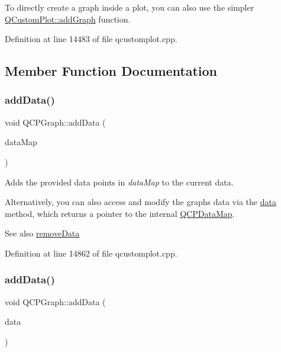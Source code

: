 To directly create a graph inside a plot, you can also use the simpler \hyperlink{class_q_custom_plot_a6fb2873d35a8a8089842d81a70a54167}{Q\+Custom\+Plot\+::add\+Graph} function. 

Definition at line 14483 of file qcustomplot.\+cpp.



\subsection{Member Function Documentation}
\mbox{\label{class_q_c_p_graph_aa5c6181d84db72ce4dbe9dc15a34ef4f}} 
\subsubsection{\texorpdfstring{add\+Data()}{addData()}\hspace{0.1cm}{\footnotesize\ttfamily [1/4]}}
{\footnotesize\ttfamily void Q\+C\+P\+Graph\+::add\+Data (\begin{DoxyParamCaption}\item[{const \hyperlink{qcustomplot_8h_a84a9c4a4c2216ccfdcb5f3067cda76e3}{Q\+C\+P\+Data\+Map} \&}]{data\+Map }\end{DoxyParamCaption})}

Adds the provided data points in {\itshape data\+Map} to the current data.

Alternatively, you can also access and modify the graph\textquotesingle{}s data via the \hyperlink{class_q_c_p_graph_acde1c0d1f6a817930489548396e6b3e6}{data} method, which returns a pointer to the internal \hyperlink{qcustomplot_8h_a84a9c4a4c2216ccfdcb5f3067cda76e3}{Q\+C\+P\+Data\+Map}.

\begin{DoxySeeAlso}{See also}
\hyperlink{class_q_c_p_graph_a4a0fde50b7db9db0a85b5c5b6b10098f}{remove\+Data} 
\end{DoxySeeAlso}


Definition at line 14862 of file qcustomplot.\+cpp.

\mbox{\label{class_q_c_p_graph_a80cc91e1e0ef77eb50afc5b366d0efd9}} 
\subsubsection{\texorpdfstring{add\+Data()}{addData()}\hspace{0.1cm}{\footnotesize\ttfamily [2/4]}}
{\footnotesize\ttfamily void Q\+C\+P\+Graph\+::add\+Data (\begin{DoxyParamCaption}\item[{const \hyperlink{class_q_c_p_data}{Q\+C\+P\+Data} \&}]{data }\end{DoxyParamCaption})}

